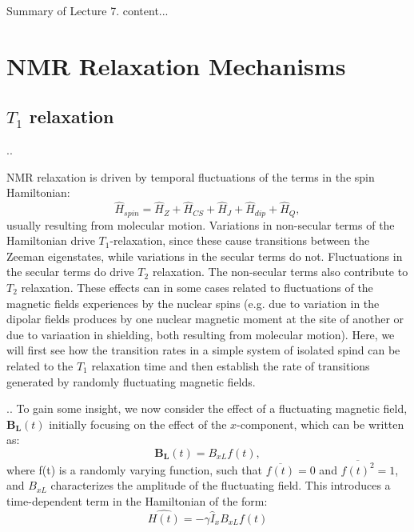 \documentclass{beamer}
\begin{document}
\begin{frame}{Summary of Lecture 7.}
	content...
\end{frame}

\section{NMR Relaxation Mechanisms}
\subsection{$T_1$ relaxation}

\begin{frame}{\thesection.\thesubsection. \insertsubsection}

   NMR relaxation is driven by temporal fluctuations of the terms in the spin Hamiltonian:
   \begin{equation}
     \hat{H}_{spin} = \hat{H}_Z + \hat{H}_{CS} + \hat{H}_J + \hat{H}_{dip} + \hat{H}_Q, 
   \end{equation} 
   usually resulting from molecular motion. Variations in non-secular terms of the Hamiltonian drive $T_1$-relaxation, since these cause transitions between the Zeeman eigenstates, while variations in the secular terms do not. Fluctuations in the secular terms do drive $T_2$ relaxation. The non-secular terms also contribute to $T_2$ relaxation.
   These effects can in some cases related to fluctuations of the magnetic fields experiences by the nuclear spins (e.g. due to variation in the dipolar fields produces by one nuclear magnetic moment at the site of another or due to variaation in shielding, both resulting from molecular motion). Here, we will first see how the transition rates in a simple system of isolated spind can be related to the $T_1$ relaxation time and then establish the rate of transitions generated by randomly fluctuating magnetic fields.
\end{frame}

\begin{frame}{\thesection.\thesubsection. \insertsubsection}
   To gain some insight, we now consider the effect of a fluctuating magnetic field, $\bm{B_L}(t)$ initially focusing on the effect of the $x$-component, which can be written as:
    \begin{equation}
       \bm{B_L}(t) = B_{xL} f(t),
    \end{equation}
    where f(t) is a randomly varying function, such that $\overline{f(t)} = 0$ and $\overline{f(t)^2} = 1$, and $B_{xL}$ characterizes the amplitude of the fluctuating field. This introduces a time-dependent term in the Hamiltonian of the form:
    \begin{equation}
      \hat{H(t)} = - \gamma \hat{I}_x B_{xL} f(t)
    \end{equation}
    
\end{frame}
\end{document}
